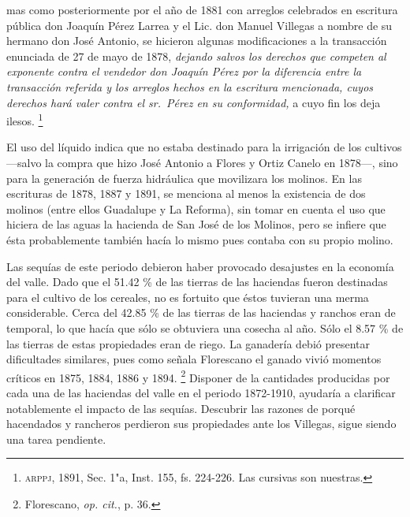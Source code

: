 \documentclass[14pt,twoside,final]{extbook} %
\let\oldfootnote\footnote
\renewcommand\footnote[1]{%
\oldfootnote{\hspace{1mm}#1}}
\begin{document}
\begin{quoting}
mas como posteriormente por el año de 1881 con arreglos celebrados en escritura pública don Joaquín Pérez Larrea y el Lic. don Manuel Villegas a nombre de su hermano don José Antonio, se hicieron algunas modificaciones a la transacción enunciada de 27 de mayo de 1878, \emph{dejando salvos los derechos que competen al exponente contra el vendedor don Joaquín Pérez por la diferencia entre la transacción referida y los arreglos hechos en la escritura mencionada, cuyos derechos hará valer contra el sr.~Pérez en su conformidad,} a cuyo fin los deja ilesos.\footnote{\textsc{arppj}, 1891, Sec. 1"a, Inst. 155, fs. 224-226. Las cursivas son nuestras.}
\end{quoting}
El uso del líquido indica que no estaba destinado para la irrigación de los cultivos ---salvo la compra que hizo José Antonio a Flores y Ortiz Canelo en 1878---, sino para la generación de fuerza hidráulica que movilizara los molinos. En las escrituras de 1878, 1887 y 1891, se menciona al menos la existencia de dos molinos (entre ellos Guadalupe y La Reforma), sin tomar en cuenta el uso que hiciera de las aguas la hacienda de San José de los Molinos, pero se infiere que ésta probablemente también hacía lo mismo pues contaba con su propio molino.

Las sequías de este periodo debieron haber provocado desajustes en la economía del valle. Dado que el 51.42 \% de las tierras de las haciendas fueron destinadas para el cultivo de los cereales, no es fortuito que éstos tuvieran una merma considerable. Cerca del 42.85 \% de las tierras de las haciendas y ranchos eran de temporal, lo que hacía que sólo se obtuviera una cosecha al año. Sólo el 8.57 \% de las tierras de estas propiedades eran de riego. La ganadería debió presentar dificultades similares, pues como señala Florescano el ganado vivió momentos críticos en 1875, 1884, 1886 y 1894.\footnote{Florescano, \emph{op. cit.}, p. 36.} Disponer de la cantidades producidas por cada una de las haciendas del valle en el periodo 1872-1910, ayudaría a clarificar notablemente el impacto de las sequías. Descubrir las razones de porqué hacendados y rancheros perdieron sus propiedades ante los Villegas, sigue siendo una tarea pendiente.
\end{document}
